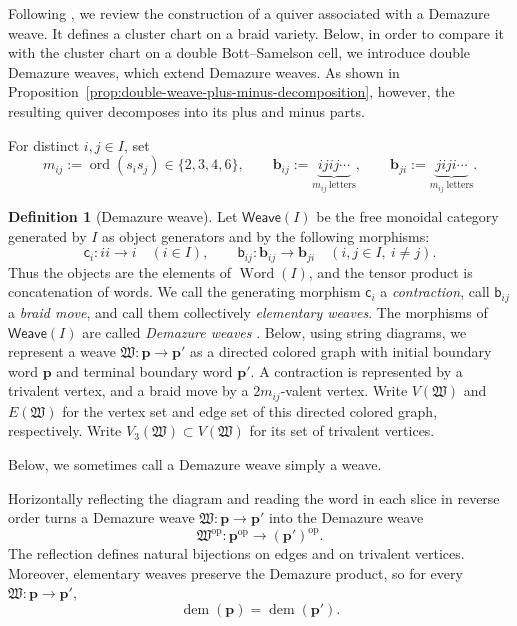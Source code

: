 \documentclass[10pt,a4paper]{article}
\theoremstyle{definition}
\newtheorem{definition}[theorem]{Definition}
\theoremstyle{remark}
\newcommand{\fW}{\mathfrak W}
\newcommand{\Word}{\operatorname{Word}}
\begin{document}
Following \cite{CasalsEtAlBraidVarieties}, we review the construction of a
quiver associated with a Demazure weave.  It defines a cluster chart on a
braid variety.  Below, in order to compare it with the cluster chart on a
double Bott--Samelson cell, we introduce double Demazure weaves, which extend
Demazure weaves.  As shown in
Proposition~\ref{prop:double-weave-plus-minus-decomposition}, however, the
resulting quiver decomposes into its plus and minus parts.

For distinct \(i,j\in I\), set
\[
 m_{ij}:=\operatorname{ord}(s_is_j)\in\{2,3,4,6\},\qquad
 \mathbf b_{ij}:=\underbrace{ijij\cdots}_{m_{ij}\ \mathrm{letters}},\qquad
 \mathbf b_{ji}:=\underbrace{jiji\cdots}_{m_{ij}\ \mathrm{letters}}.
\]

\begin{definition}[Demazure weave]
\label{def:demazure-weave}
Let \(\mathsf{Weave}(I)\) be the free monoidal category generated by \(I\) as
object generators and by the following morphisms:
\[
 \mathsf c_i:ii\longrightarrow i
 \quad(i\in I),
 \qquad
 \mathsf b_{ij}:\mathbf b_{ij}\longrightarrow\mathbf b_{ji}
 \quad(i,j\in I,\ i\ne j).
\]
Thus the objects are the elements of \(\Word(I)\), and the tensor product is
concatenation of words.  We call the generating morphism \(\mathsf c_i\) a
\emph{contraction}, call \(\mathsf b_{ij}\) a \emph{braid move}, and call
them collectively \emph{elementary weaves}.  The morphisms of
\(\mathsf{Weave}(I)\) are called \emph{Demazure weaves}
\cite[Section~4]{CasalsGorskyGorskySimental2020}.  Below, using string
diagrams, we represent a weave \(\fW:\mathbf p\to\mathbf p'\) as a directed
colored graph with initial boundary word \(\mathbf p\) and terminal boundary
word \(\mathbf p'\).  A contraction is represented by a trivalent vertex, and
a braid move by a \(2m_{ij}\)-valent vertex.  Write \(V(\fW)\) and \(E(\fW)\)
for the vertex set and edge set of this directed colored graph, respectively.
Write \(V_3(\fW)\subset V(\fW)\) for its set of trivalent vertices.
\end{definition}

Below, we sometimes call a Demazure weave simply a weave.

Horizontally reflecting the diagram and reading the word in each slice in
reverse order turns a Demazure weave \(\fW:\mathbf p\to\mathbf p'\) into the
Demazure weave
\begin{equation}
 \fW^{\mathrm{op}}:\mathbf p^{\mathrm{op}}\longrightarrow(\mathbf p')^{\mathrm{op}}.
 \label{eq:opposite-weave}
\end{equation}
The reflection defines natural bijections on edges and on trivalent vertices.
Moreover, elementary weaves preserve the Demazure product, so for every
\(\fW:\mathbf p\to\mathbf p'\),
\begin{equation}
 \operatorname{dem}(\mathbf p)=\operatorname{dem}(\mathbf p').
 \label{eq:demazure-weave-preserves-dem}
\end{equation}
\end{document}
